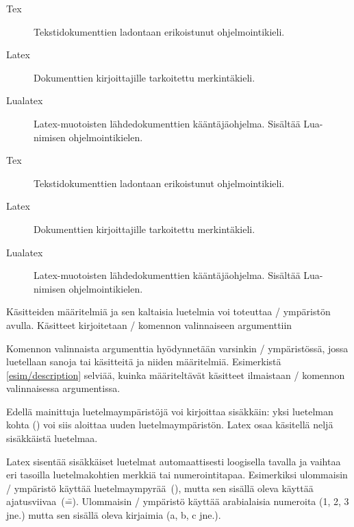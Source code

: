 \begin{esimerkki*}

\begin{koodilohko}
\begin{description}
\item[Tex] Tekstidokumenttien ladontaan erikoistunut ohjelmointikieli.
\item[Latex] Dokumenttien kirjoittajille tarkoitettu merkintäkieli.
\item[Lualatex] Latex-muotoisten lähdedokumenttien kääntäjäohjelma.
  Sisältää Lua-nimisen ohjelmointikielen.
\end{description}
\end{koodilohko}

  \begin{tulos}
    \begin{description}
    \item[Tex] Tekstidokumenttien ladontaan erikoistunut ohjelmointikieli.
    \item[Latex] Dokumenttien kirjoittajille tarkoitettu merkintäkieli.
    \item[Lualatex] Latex-muotoisten lähdedokumenttien kääntäjäohjelma.
      Sisältää Lua-nimi\-sen ohjelmointikielen.
    \end{description}
  \end{tulos}
  \caption{Käsitteiden määritelmiä ja sen kaltaisia luetelmia voi
    toteuttaa \-/ ympäristön avulla. Käsitteet
    kirjoitetaan \-/ komennon valinnaiseen argumenttiin}
  \label{esim/description}
\end{esimerkki*}

\noindent
Komennon valinnaista argumenttia hyödynnetään varsinkin
\-/ ympäristössä, jossa luetellaan sanoja tai
käsitteitä ja niiden määritelmiä. Esimerkistä \ref{esim/description}
selviää, kuinka määriteltävät käsitteet ilmaistaan \-/
komennon valinnaisessa argumentissa.

Edellä mainittuja luetelmaympäristöjä voi kirjoittaa sisäkkäin: yksi
luetelman kohta () voi siis aloittaa uuden
luetelmaympäristön. Latex osaa käsitellä neljä sisäkkäistä luetelmaa.

Latex sisentää sisäkkäiset luetelmat automaattisesti loogisella tavalla
ja vaihtaa eri tasoilla luetelmakohtien merkkiä tai numerointitapaa.
Esimerkiksi ulommaisin \-/ ympäristö käyttää
luetelmaympyrää~(\textbullet), mutta sen sisällä oleva käyttää
ajatusviivaa~(\==). Ulommaisin \-/ ympäristö
käyttää arabialaisia numeroita (1, 2, 3 jne.) mutta sen sisällä oleva
kirjaimia (a, b, c jne.).

